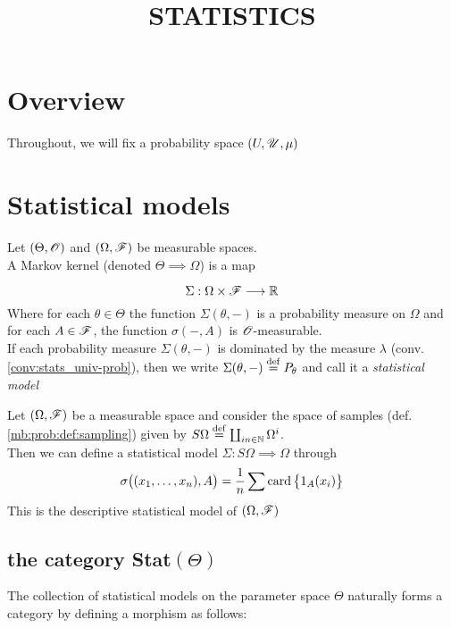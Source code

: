 


\title{STATISTICS}

\maketitle	


\noindent\hrulefill
\tableofcontents
\noindent\hrulefill

\label{section-phantom}

\section{Overview}

\begin{convention}\label{conv:stats_univ-prob}
Throughout, we will fix a probability space $(U,\r{U},\mu)$
\end{convention}
\section{Statistical models}
\begin{definition}
Let $(\Theta, \r{O})$ and $(\Omega,\r{F})$ be measurable spaces.\\
A Markov kernel (denoted $\Theta\implies \Omega$) is a map

\[
\Sigma: \Omega \times \r{F}\mor \d{R}
\]
Where for each $\theta \in \Theta$ the function $\Sigma(\theta,-)$ is a probability measure on $\Omega$ and for each $A \in\r{F}$, the function $\sigma(-,A)$ is $\r{O}$-measurable.\\
If each probability measure $\Sigma(\theta,-)$ is dominated by the measure $\lambda$ (conv. \ref{conv:stats_univ-prob}), then we write $\Sigma(\theta,-)\stackrel{\operatorname{def}}{=} P_\theta$ and call it a \emph{statistical model}
\end{definition}

\begin{example}
Let $(\Omega, \r{F})$ be a measurable space and consider the  space  of samples (def. \ref{mb:prob:def:sampling}) given by $S\Omega\stackrel{\operatorname{def}}{=} \coprod_{in \in\mathbb{N}}\Omega^i$.\\
Then we can define a statistical model $\Sigma: S\Omega \implies \Omega$ through
\[
\sigma\big((x_1,\ldots, x_n), A\big)=\frac{1}{n}\sum \operatorname{card}\big\{1_{A}(x_i)\big\}
\]
This is the descriptive statistical model of $(\Omega, \r{F})$\end{example}
\subsection{the category Stat$(\Theta)$}
The collection of statistical models on  the parameter space $\Theta$ naturally forms a category by defining a morphism as follows:



